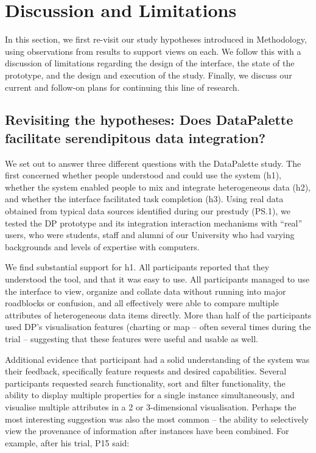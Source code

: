 \documentclass{sigchi}
\begin{document}
\section{Discussion and Limitations}

In this section, we first re-visit our study hypotheses introduced in Methodology, using observations from results to support views on each.  We follow this with a discussion of limitations regarding the design of the interface, the state of the prototype, and the design and execution of the study.  Finally, we discuss our current and follow-on plans for continuing this line of research.

\subsection{Revisiting the hypotheses: Does DataPalette facilitate serendipitous data integration?}

We set out to answer three different questions with the DataPalette study. The first concerned whether people understood and could use the system (h1), whether the system enabled people to mix and integrate heterogeneous data (h2), and whether the interface facilitated task completion (h3).  Using real data obtained from typical data sources identified during our prestudy (PS.1), we tested the DP prototype and its integration interaction mechanisms with ``real'' users, who were students, staff and alumni of our University who had varying backgrounds and levels of expertise with computers.

We find substantial support for h1. All participants reported that they understood the tool, and that it was easy to use.   All participants managed to use the interface to view, organize and collate data without running into major roadblocks or confusion, and all effectively were able to compare multiple attributes of heterogeneous data items directly.  More than half of the participants used DP's visualisation features (charting or map -- often several times during the trial -- suggesting that these features were useful and usable as well.  

Additional evidence that participant had a solid understanding of the system was their feedback, specifically feature requests and desired capabilities.  Several participants requested search functionality, sort and filter functionality, the ability to display multiple properties for a single instance simultaneously, and visualise multiple attributes in a 2 or 3-dimensional visualisation.  Perhaps the most interesting suggestion was also the most common -- the ability to selectively view the provenance of information after instances have been combined.  For example, after his trial, P15 said:
\end{document}
